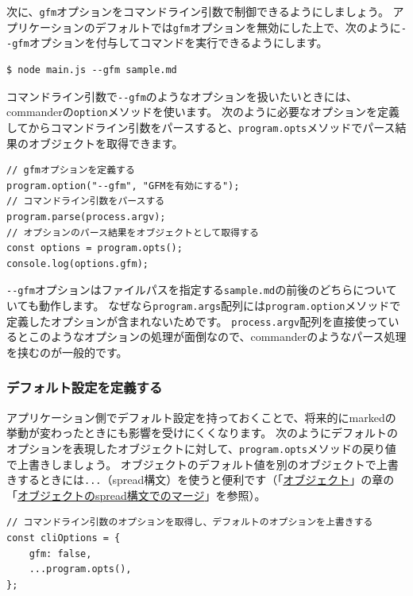 次に、\texttt{gfm}オプションをコマンドライン引数で制御できるようにしましょう。
アプリケーションのデフォルトでは\texttt{gfm}オプションを無効にした上で、次のように\texttt{-\/-gfm}オプションを付与してコマンドを実行できるようにします。

\begin{lstlisting}
$ node main.js --gfm sample.md
\end{lstlisting}

コマンドライン引数で\texttt{-\/-gfm}のようなオプションを扱いたいときには、commanderの\texttt{option}メソッドを使います。
次のように必要なオプションを定義してからコマンドライン引数をパースすると、\texttt{program.opts}メソッドでパース結果のオブジェクトを取得できます。

\begin{lstlisting}
// gfmオプションを定義する
program.option("--gfm", "GFMを有効にする");
// コマンドライン引数をパースする
program.parse(process.argv);
// オプションのパース結果をオブジェクトとして取得する
const options = program.opts();
console.log(options.gfm);
\end{lstlisting}

\texttt{-\/-gfm}オプションはファイルパスを指定する\texttt{sample.md}の前後のどちらについていても動作します。
なぜなら\texttt{program.args}配列には\texttt{program.option}メソッドで定義したオプションが含まれないためです。
\texttt{process.argv}配列を直接使っているとこのようなオプションの処理が面倒なので、commanderのようなパース処理を挟むのが一般的です。

\hypertarget{declare-default}{%
\subsubsection{デフォルト設定を定義する}\label{declare-default}}

アプリケーション側でデフォルト設定を持っておくことで、将来的にmarkedの挙動が変わったときにも影響を受けにくくなります。
次のようにデフォルトのオプションを表現したオブジェクトに対して、\texttt{program.opts}メソッドの戻り値で上書きしましょう。
オブジェクトのデフォルト値を別のオブジェクトで上書きするときには\texttt{...}（spread構文）を使うと便利です（「\hyperlink{object}{オブジェクト}」の章の「\hyperlink{object-spread-syntax}{オブジェクトのspread構文でのマージ}」を参照）。

\begin{lstlisting}
// コマンドライン引数のオプションを取得し、デフォルトのオプションを上書きする
const cliOptions = {
    gfm: false,
    ...program.opts(),
};
\end{lstlisting}

